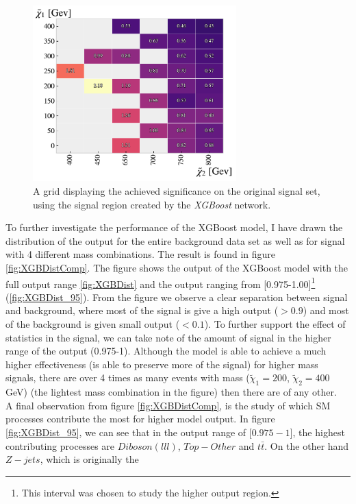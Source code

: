 \begin{figure}
    \centering
    \includegraphics[width=0.7\textwidth]{Figures/MLResults/XGB/SUSY/Grid/XGBGridSig.pdf}
    \caption{A grid displaying the achieved significance on the original signal set, using the signal region 
    created by the \emph{XGBoost} network.}
    \label{fig:XGBoost}
\end{figure}
To further investigate the performance of the XGBoost model, I have drawn the distribution of the output for the 
entire background data set as well as for signal with 4 different mass combinations. The result is found in figure 
\ref{fig:XGBDistComp}. The figure shows the output of the XGBoost model with the full output range \ref{fig:XGBDist}
and the output ranging from [0.975-1.00]\footnote{This interval was chosen to study the higher output region.} (\ref{fig:XGBDist_95}). 
From the figure we observe a clear separation between 
signal and background, where most of the signal is give a high output ($>0.9$) and most of the background is given small
output ($<0.1$). To further support the effect of statistics in the signal, we can take note of the 
amount of signal in the higher range of the output (0.975-1). Although the model is able to achieve a much higher 
effectiveness (is able to preserve more of the signal) for higher mass signals, there are over 4 times as many 
events with mass ($\tilde{\chi}_1=200$, $\tilde{\chi}_2=400$GeV) (the lightest mass combination in the figure) then there 
are of any other.
\\
A final observation from figure \ref{fig:XGBDistComp}, is the study of which \ac{SM} processes contribute the most 
for higher model output. In figure \ref{fig:XGBDist_95}, we can see that in the output range of [$0.975-1$], the highest 
contributing processes are $Diboson(lll)$, $Top-Other$ and $t\bar{t}$. On the other hand $Z-jets$, which is originally the 
